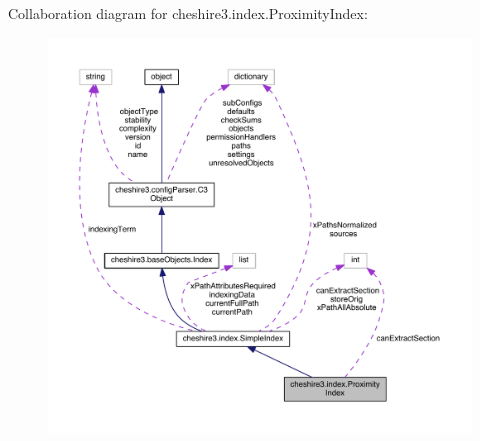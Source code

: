 Collaboration diagram for cheshire3.\-index.\-Proximity\-Index\-:
\nopagebreak
\begin{figure}[H]
\begin{center}
\leavevmode
\includegraphics[width=350pt]{classcheshire3_1_1index_1_1_proximity_index__coll__graph}
\end{center}
\end{figure}
